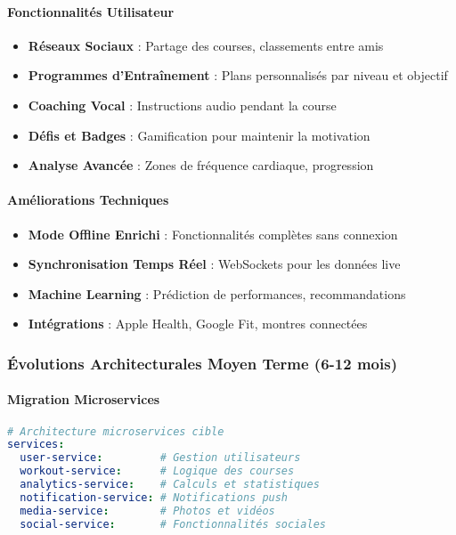 \paragraph{Fonctionnalités Utilisateur}
\begin{itemize}
    \item \textbf{Réseaux Sociaux} : Partage des courses, classements entre amis
    \item \textbf{Programmes d'Entraînement} : Plans personnalisés par niveau et objectif
    \item \textbf{Coaching Vocal} : Instructions audio pendant la course
    \item \textbf{Défis et Badges} : Gamification pour maintenir la motivation
    \item \textbf{Analyse Avancée} : Zones de fréquence cardiaque, progression
\end{itemize}

\paragraph{Améliorations Techniques}
\begin{itemize}
    \item \textbf{Mode Offline Enrichi} : Fonctionnalités complètes sans connexion
    \item \textbf{Synchronisation Temps Réel} : WebSockets pour les données live
    \item \textbf{Machine Learning} : Prédiction de performances, recommandations
    \item \textbf{Intégrations} : Apple Health, Google Fit, montres connectées
\end{itemize}

\subsubsection{Évolutions Architecturales Moyen Terme (6-12 mois)}

\paragraph{Migration Microservices}
\begin{lstlisting}[language=yaml]
# Architecture microservices cible
services:
  user-service:         # Gestion utilisateurs
  workout-service:      # Logique des courses
  analytics-service:    # Calculs et statistiques  
  notification-service: # Notifications push
  media-service:        # Photos et vidéos
  social-service:       # Fonctionnalités sociales
\end{lstlisting}

